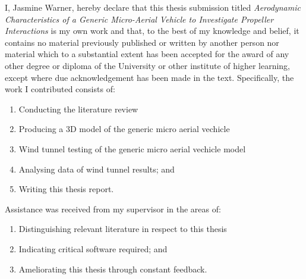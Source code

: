 
\begin{declaration}
\vspace{-3em}
I, Jasmine Warner, hereby declare that this thesis submission titled \emph{Aerodynamic Characteristics of a Generic Micro-Aerial Vehicle to Investigate Propeller Interactions} is my own work and that, to the best of my knowledge and belief, it contains no material previously published or written by another person nor material which to a substantial extent has been accepted for the award of any other degree or diploma of the University or other institute of higher learning, except where due acknowledgement has been made in the text.  Specifically, the work I contributed consists of:

\vspace{-1em}

\begin{enumerate}
    \item Conducting the literature review
    \item Producing a 3D model of the generic micro aerial vechicle
    \item Wind tunnel testing of the generic micro aerial vechicle model
    \item Analysing data of wind tunnel results; and
    \item Writing this thesis report.
\end{enumerate}

\vspace{-1em}

Assistance was received from my supervisor in the areas of:

\vspace{-1em}

\begin{enumerate}
    \item Distinguishing relevant literature in respect to this thesis
    \item Indicating critical software required; and
    \item Ameliorating this thesis through constant feedback.
\end{enumerate}

\vspace{0.5cm}


\end{declaration}
